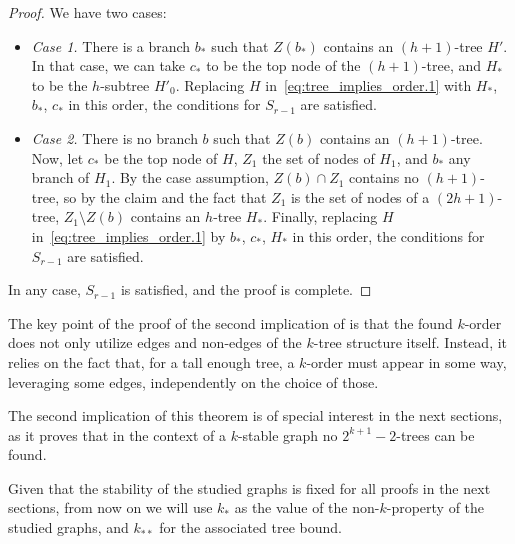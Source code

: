 \begin{theorem}
\begin{proof}
                We have two cases:
                \begin{itemize}
                    \item \emph{Case 1.} There is a branch $b_*$ such that $Z(b_*)$ contains an $(h+1)$-tree $H'$.
                        In that case, we can take $c_*$ to be the top node of the $(h+1)$-tree, and $H_*$ to be the
                        $h$-subtree $H'_0$.
                        Replacing $H$ in~\eqref{eq:tree_implies_order.1} with $H_*$, $b_*$, $c_*$ in this order, the
                        conditions for $S_{r-1}$ are satisfied.
                    \item \emph{Case 2.} There is no branch $b$ such that $Z(b)$ contains an $(h+1)$-tree.
                        Now, let $c_*$ be the top node of $H$, $Z_1$ the set of nodes of $H_1$, and
                        $b_*$ any branch of $H_1$.
                        By the case assumption, $Z(b) \cap Z_1$ contains no $(h+1)$-tree, so by the claim
                        and the fact that $Z_1$ is the set of nodes of a $(2h+1)$-tree,
                        $Z_1 \setminus Z(b)$ contains an $h$-tree $H_*$.
                        Finally, replacing $H$ in~\eqref{eq:tree_implies_order.1} by $b_*$, $c_*$, $H_*$ in this order, the
                        conditions for $S_{r-1}$ are satisfied.
                \end{itemize}
                In any case, $S_{r-1}$ is satisfied, and the proof is complete.
            \end{proof}
        \end{theorem}

        \begin{remark}
            The key point of the proof of the second implication of  is that the found $k$-order
            does not only utilize edges and non-edges of the $k$-tree structure itself.
            Instead, it relies on the fact that, for a tall enough tree, a $k$-order must appear in some way, leveraging
            some  edges, independently on the choice of those.
        \end{remark}

        The second implication of this theorem is of special interest in the next sections, as it proves that in the context
        of a $k$-stable graph no $2^{k+1}-2$-trees can be found.

        Given that the stability of the studied graphs is fixed for all proofs in the next sections, from now on we will use
        $k_*$ as the value of the non-$k$-property of the studied graphs, and $k_{**}$ for the associated tree bound.